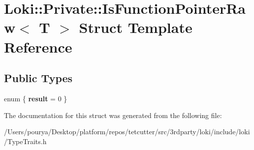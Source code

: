 \hypertarget{structLoki_1_1Private_1_1IsFunctionPointerRaw}{}\section{Loki\+:\+:Private\+:\+:Is\+Function\+Pointer\+Raw$<$ T $>$ Struct Template Reference}
\label{structLoki_1_1Private_1_1IsFunctionPointerRaw}
\subsection*{Public Types}
\begin{DoxyCompactItemize}
\item 
\hypertarget{structLoki_1_1Private_1_1IsFunctionPointerRaw_aad1d8bc3fe33c6049a9e0edb47883db8}{}enum \{ {\bfseries result} = 0
 \}\label{structLoki_1_1Private_1_1IsFunctionPointerRaw_aad1d8bc3fe33c6049a9e0edb47883db8}

\end{DoxyCompactItemize}


The documentation for this struct was generated from the following file\+:\begin{DoxyCompactItemize}
\item 
/\+Users/pourya/\+Desktop/platform/repos/tetcutter/src/3rdparty/loki/include/loki/Type\+Traits.\+h\end{DoxyCompactItemize}

